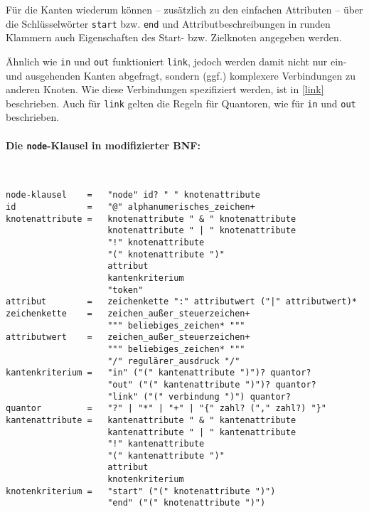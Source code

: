 \documentclass[12pt]{scrartcl}
\begin{document}
Für die Kanten wiederum können – zusätzlich zu den einfachen Attributen – über die Schlüsselwörter \texttt{start} bzw. \texttt{end} und Attributbeschreibungen in runden Klammern auch Eigenschaften des Start- bzw. Zielknoten angegeben werden.

Ähnlich wie \texttt{in} und \texttt{out} funktioniert \texttt{link}, jedoch werden damit nicht nur ein- und ausgehenden Kanten abgefragt, sondern (ggf.) komplexere Verbindungen zu anderen Knoten. Wie diese Verbindungen spezifiziert werden, ist in \ref{link} beschrieben. Auch für \texttt{link} gelten die Regeln für Quantoren, wie für \texttt{in} und \texttt{out} beschrieben.

\paragraph*{Die \texttt{node}-Klausel in modifizierter BNF:}
~
\begin{framed}
\begin{lstlisting}
node-klausel    =   "node" id? " " knotenattribute
id              =   "@" alphanumerisches_zeichen+
knotenattribute =   knotenattribute " & " knotenattribute
                    knotenattribute " | " knotenattribute
                    "!" knotenattribute
                    "(" knotenattribute ")"
                    attribut
                    kantenkriterium
                    "token"
attribut        =   zeichenkette ":" attributwert ("|" attributwert)*
zeichenkette    =   zeichen_außer_steuerzeichen+
                    """ beliebiges_zeichen* """
attributwert    =   zeichen_außer_steuerzeichen+
                    """ beliebiges_zeichen* """
                    "/" regulärer_ausdruck "/"
kantenkriterium =   "in" ("(" kantenattribute ")")? quantor?
                    "out" ("(" kantenattribute ")")? quantor?
                    "link" ("(" verbindung ")") quantor?
quantor         =   "?" | "*" | "+" | "{" zahl? ("," zahl?) "}"
kantenattribute =   kantenattribute " & " kantenattribute
                    kantenattribute " | " kantenattribute
                    "!" kantenattribute
                    "(" kantenattribute ")"
                    attribut
                    knotenkriterium
knotenkriterium =   "start" ("(" knotenattribute ")")
                    "end" ("(" knotenattribute ")")
\end{lstlisting}
\end{framed}
\end{document}
